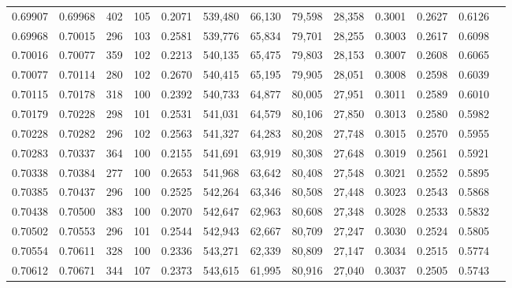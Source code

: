 \begin{tabular}{rrrrrrrrrrrrr}
0.69907 & 0.69968 &   402 & 105 &                                     0.2071 & 539,480 &  66,130 &  79,598 &  28,358 & 0.3001 & 0.2627 & 0.6126 \\
0.69968 & 0.70015 &   296 & 103 &                                     0.2581 & 539,776 &  65,834 &  79,701 &  28,255 & 0.3003 & 0.2617 & 0.6098 \\
0.70016 & 0.70077 &   359 & 102 &                                     0.2213 & 540,135 &  65,475 &  79,803 &  28,153 & 0.3007 & 0.2608 & 0.6065 \\
0.70077 & 0.70114 &   280 & 102 &                                     0.2670 & 540,415 &  65,195 &  79,905 &  28,051 & 0.3008 & 0.2598 & 0.6039 \\
0.70115 & 0.70178 &   318 & 100 &                                     0.2392 & 540,733 &  64,877 &  80,005 &  27,951 & 0.3011 & 0.2589 & 0.6010 \\
0.70179 & 0.70228 &   298 & 101 &                                     0.2531 & 541,031 &  64,579 &  80,106 &  27,850 & 0.3013 & 0.2580 & 0.5982 \\
0.70228 & 0.70282 &   296 & 102 &                                     0.2563 & 541,327 &  64,283 &  80,208 &  27,748 & 0.3015 & 0.2570 & 0.5955 \\
0.70283 & 0.70337 &   364 & 100 &                                     0.2155 & 541,691 &  63,919 &  80,308 &  27,648 & 0.3019 & 0.2561 & 0.5921 \\
0.70338 & 0.70384 &   277 & 100 &                                     0.2653 & 541,968 &  63,642 &  80,408 &  27,548 & 0.3021 & 0.2552 & 0.5895 \\
0.70385 & 0.70437 &   296 & 100 &                                     0.2525 & 542,264 &  63,346 &  80,508 &  27,448 & 0.3023 & 0.2543 & 0.5868 \\
0.70438 & 0.70500 &   383 & 100 &                                     0.2070 & 542,647 &  62,963 &  80,608 &  27,348 & 0.3028 & 0.2533 & 0.5832 \\
0.70502 & 0.70553 &   296 & 101 &                                     0.2544 & 542,943 &  62,667 &  80,709 &  27,247 & 0.3030 & 0.2524 & 0.5805 \\
0.70554 & 0.70611 &   328 & 100 &                                     0.2336 & 543,271 &  62,339 &  80,809 &  27,147 & 0.3034 & 0.2515 & 0.5774 \\
0.70612 & 0.70671 &   344 & 107 &                                     0.2373 & 543,615 &  61,995 &  80,916 &  27,040 & 0.3037 & 0.2505 & 0.5743 \\

\end{tabular}
